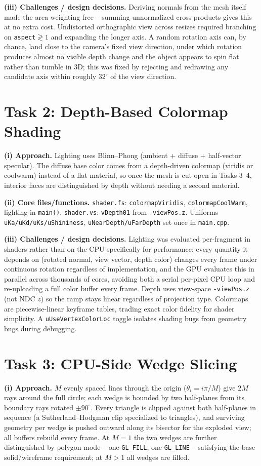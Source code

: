 \documentclass[10pt]{article}
\begin{document}
\textbf{(iii) Challenges / design decisions.} Deriving normals from the mesh itself made the area-weighting free -- summing unnormalized cross products gives this at no extra cost. Undistorted orthographic view across resizes required branching on \texttt{aspect}$\gtrless1$ and expanding the longer axis. A random rotation axis can, by chance, land close to the camera's fixed view direction, under which rotation produces almost no visible depth change and the object appears to spin flat rather than tumble in 3D; this was fixed by rejecting and redrawing any candidate axis within roughly $32^\circ$ of the view direction.

\section{Task 2: Depth-Based Colormap Shading}
\textbf{(i) Approach.} Lighting uses Blinn--Phong (ambient + diffuse + half-vector specular). The diffuse base color comes from a depth-driven colormap (viridis or coolwarm) instead of a flat material, so once the mesh is cut open in Tasks 3--4, interior faces are distinguished by depth without needing a second material.

\textbf{(ii) Core files/functions.} \texttt{shader.fs}: \texttt{colormapViridis}, \texttt{colormapCoolWarm}, lighting in \texttt{main()}. \texttt{shader.vs}: \texttt{vDepth01} from \texttt{-viewPos.z}. Uniforms \texttt{uKa/uKd/uKs/uShininess}, \texttt{uNearDepth/uFarDepth} set once in \texttt{main.cpp}.

\textbf{(iii) Challenges / design decisions.} Lighting was evaluated per-fragment in shaders rather than on the CPU specifically for performance: every quantity it depends on (rotated normal, view vector, depth color) changes every frame under continuous rotation regardless of implementation, and the GPU evaluates this in parallel across thousands of cores, avoiding both a serial per-pixel CPU loop and re-uploading a full color buffer every frame. Depth uses view-space \texttt{-viewPos.z} (not NDC $z$) so the ramp stays linear regardless of projection type. Colormaps are piecewise-linear keyframe tables, trading exact color fidelity for shader simplicity. A \texttt{uUseVertexColorLoc} toggle isolates shading bugs from geometry bugs during debugging.

\section{Task 3: CPU-Side Wedge Slicing}
\textbf{(i) Approach.} $M$ evenly spaced lines through the origin ($\theta_i=i\pi/M$) give $2M$ rays around the full circle; each wedge is bounded by two half-planes from its boundary rays rotated $\pm90^\circ$. Every triangle is clipped against both half-planes in sequence (a Sutherland--Hodgman clip specialized to triangles), and surviving geometry per wedge is pushed outward along its bisector for the exploded view; all buffers rebuild every frame. At $M=1$ the two wedges are further distinguished by polygon mode -- one \texttt{GL\_FILL}, one \texttt{GL\_LINE} -- satisfying the base solid/wireframe requirement; at $M>1$ all wedges are filled.
\end{document}
